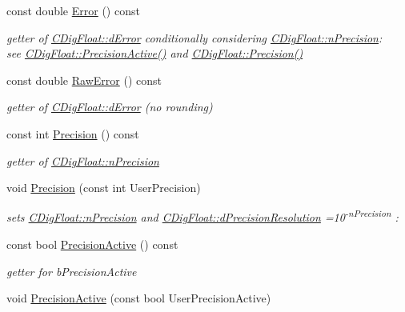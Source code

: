 \begin{DoxyCompactItemize}
const double \hyperlink{classCDigFloat_a1b067b1bde507408956fa65bef7368bb}{Error} () const
\begin{DoxyCompactList}\small\item\em getter of \hyperlink{classCDigFloat_a25eb3782d1e727ff007a48f8308e3d4d}{C\+Dig\+Float\+::d\+Error} conditionally considering \hyperlink{classCDigFloat_ad580654be35246d14c91482581c0bc11}{C\+Dig\+Float\+::n\+Precision}\+: ~\newline
 see \hyperlink{classCDigFloat_a4d6ca24beda280be719374c2a6b2c64d}{C\+Dig\+Float\+::\+Precision\+Active()} and \hyperlink{classCDigFloat_a95875f6f7246debee0d00b0c41c82aee}{C\+Dig\+Float\+::\+Precision()} \end{DoxyCompactList}\item 
const double \hyperlink{classCDigFloat_a9805530caa01cc722cfbe8912689daa7}{Raw\+Error} () const
\begin{DoxyCompactList}\small\item\em getter of \hyperlink{classCDigFloat_a25eb3782d1e727ff007a48f8308e3d4d}{C\+Dig\+Float\+::d\+Error} (no rounding) \end{DoxyCompactList}\item 
const int \hyperlink{classCDigFloat_a95875f6f7246debee0d00b0c41c82aee}{Precision} () const
\begin{DoxyCompactList}\small\item\em getter of \hyperlink{classCDigFloat_ad580654be35246d14c91482581c0bc11}{C\+Dig\+Float\+::n\+Precision} \end{DoxyCompactList}\item 
void \hyperlink{classCDigFloat_a6d12203e256d0fba602b3cfec37f96a6}{Precision} (const int User\+Precision)
\begin{DoxyCompactList}\small\item\em sets \hyperlink{classCDigFloat_ad580654be35246d14c91482581c0bc11}{C\+Dig\+Float\+::n\+Precision} and \hyperlink{classCDigFloat_a7f9809fa0b25da57f5c8c18a02b7d1a7}{C\+Dig\+Float\+::d\+Precision\+Resolution} =10\textsuperscript{-\/n\+Precision} \+: \end{DoxyCompactList}\item 
const bool \hyperlink{classCDigFloat_a4d6ca24beda280be719374c2a6b2c64d}{Precision\+Active} () const
\begin{DoxyCompactList}\small\item\em getter for b\+Precision\+Active \end{DoxyCompactList}\item 
void \hyperlink{classCDigFloat_a680354bead4079c14a67688124bb4b85}{Precision\+Active} (const bool User\+Precision\+Active)

\end{DoxyCompactItemize}
